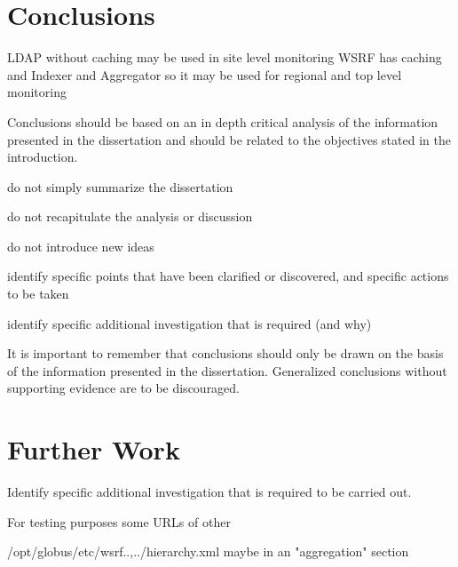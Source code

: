 \section{Conclusions}

LDAP without caching may be used in site level monitoring
WSRF has caching and Indexer and Aggregator so it may be used for regional and top level monitoring


Conclusions should be based on an in depth critical analysis of the information presented in the dissertation and should be related to the objectives stated in the introduction.

do not simply summarize the dissertation

do not recapitulate the analysis or discussion

do not introduce new ideas

identify specific points that have been clarified or discovered, and specific actions to be taken

identify specific additional investigation that is required (and why)

It is important to remember that conclusions should only be drawn on the basis of the information presented in the dissertation. Generalized conclusions without supporting evidence are to be
discouraged.

\section{Further Work}
Identify specific additional investigation that is required to be carried out.

For testing purposes some URLs of other 

/opt/globus/etc/wsrf..,../hierarchy.xml maybe in an "aggregation" section

